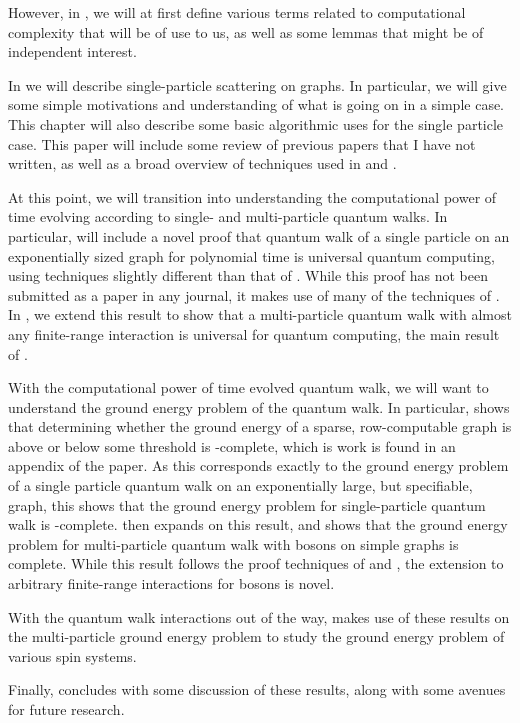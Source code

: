 \documentclass[../thesis-main/thesis-main]{subfiles}
\begin{document}
However, in , we will at first define various terms related to computational complexity that will be of use to us, as well as some lemmas that might be of independent interest.

In  we will describe single-particle scattering on graphs.  In particular, we will give some simple motivations and understanding of what is going on in a simple case.  This chapter will also describe some basic algorithmic uses for the single particle case.  This paper will include some review of previous papers 
that I have not written, as well as a broad overview of techniques used in \cite{MPQW} and \cite{momentum_switches}.

At this point, we will transition into understanding the computational power of time evolving according to single- and multi-particle quantum walks.  In particular,  will include a novel proof that quantum walk of a single particle on an exponentially sized graph for polynomial time is universal quantum computing, using techniques slightly different than that of \cite{Childs11}.  While this proof has not been submitted as a paper in any journal, it makes use of many of the techniques of \cite{MPQW}.  In , we extend this result to show that a multi-particle quantum walk with almost any finite-range interaction is universal for quantum computing, the main result of \cite{MPQW}.

With the computational power of time evolved quantum walk, we will want to understand the ground energy problem of the quantum walk.  In particular,   shows that determining whether the ground energy of a sparse, row-computable graph is above or below some threshold is \QMA-complete, which is work is found in an appendix of the \cite{BHQMA} paper.  As this corresponds exactly to the ground energy problem of a single particle quantum walk on an exponentially large, but specifiable, graph, this shows that the ground energy problem for single-particle quantum walk is \QMA-complete.  then expands on this result, and shows that the ground energy problem for multi-particle quantum walk with bosons on simple graphs is \QMA complete.  While this result follows the proof techniques of \cite{MPQW} and \cite{xy_model}, the extension to arbitrary finite-range interactions for bosons is novel.

With the quantum walk interactions out of the way,  makes use of these results on the multi-particle ground energy problem to study the ground energy problem of various spin systems.  

Finally,  concludes with some discussion of these results, along with some avenues for future research.
\end{document}
